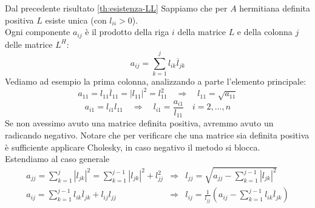 Dal precedente risultato \ref{th:esistenza-LL} Sappiamo che per $A$
hermitiana definita positiva $L$ esiste unica (con $l_{ii} > 0 $).\\
Ogni componente $a_{ij}$ è il prodotto della riga $i$ della matrice
$L$ e della colonna $j$ delle matrice $L^H$:
$$ a_{ij} = \displaystyle \sum_{k=1}^{j} l_{ik} \overline{l}_{jk} $$
Vediamo ad esempio la prima colonna, analizzando a parte l'elemento principale:
$$ a_{11} = l_{11} \overline{l}_{11} =  |l_{11}|^{2} = l_{11}^{2} 
\quad \Longrightarrow \quad
l_{11} = \sqrt{a_{11}} $$
$$ a_{i1} = l_{i1} l_{11} 
\quad \Longrightarrow \quad
l_{i1} = \frac{a_{i1}}{l_{11}} \quad i = 2, \ldots, n $$
Se non avessimo avuto una matrice definita positiva, avremmo avuto un
radicando negativo. Notare che per verificare che una matrice sia
definita positiva \`e sufficiente applicare Cholesky, in caso negativo
il metodo si blocca.\\
Estendiamo al caso generale
\[\begin{array}{lll}
a_{jj} = \displaystyle \sum_{k=1}^{j} |l_{jk}|^2 = 
\displaystyle \sum_{k=1}^{j-1} |l_{jk}|^{2} + l_{jj}^{2}
& \Longrightarrow &
l_{jj} = \sqrt{a_{jj} - \displaystyle \sum_{k=1}^{j-1} |l_{jk}|^{2}}
\\
a_{ij} = \displaystyle  \sum_{k=1}^{j-1} l_{ik} \overline{l}_{jk} +  l_{ij} l_{jj}
& \Longrightarrow &
l_{ij} = \frac{1}{l_{jj}}(a_{ij} - \displaystyle \sum_{k=1}^{j-1} l_{ik} \overline l_{jk})
\end{array}\]

